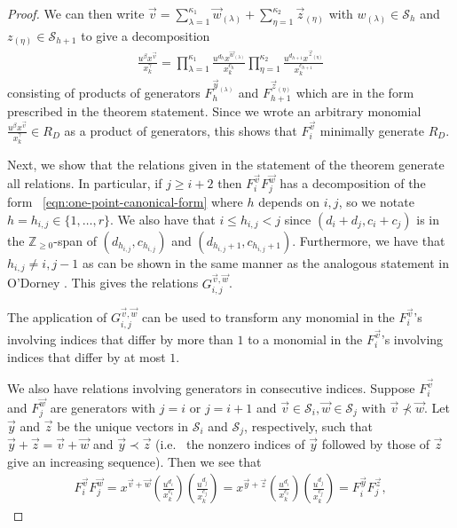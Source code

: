 \documentclass{amsart}
\theoremstyle{plain}
\theoremstyle{definition}
\theoremstyle{remark}
\numberwithin{equation}{section}
\newcommand\bz{{\mathbb Z}}
\newcommand\mss{\mathscr{S}}
\begin{document}
\begin{proof}
\noindent
We can then write $\vec{v}  = \sum_{\lambda=1}^{\kappa_1}\vec{w}_{(\lambda)} + \sum_{\eta=1}^{\kappa_2} \vec z_{(\eta)}$ with $w_{(\lambda)} \in \mss_h$ and $z_{(\eta)} \in \mss_{h+1}$ to give a decomposition
\begin{align}
\label{eqn:one-point-canonical-form}
	\frac{u^{\beta} x^{\vec{v}}} {x_k^{\gamma}}	= \prod_{\lambda = 1}
	^{\kappa_1} \frac{u^{d_h} x^{\vec{w}_{(\lambda)}}} {x_k^{c_h}}
	\prod_{\eta = 1}^{\kappa_2} \frac{u^{d_{h + 1}} x^{\vec{z}_{(\eta)}}}
	{x_k^{c_{h + 1}}}
\end{align}
\noindent
consisting of products of generators $F_h^{\vec{y}_{(\lambda)}}$
and $F_{h + 1}^{\vec{z}_{(\eta)}}$ which are in the form
prescribed in the theorem statement. Since we wrote an arbitrary monomial $\frac{u^{\beta} x^{\vec{v}}}{x_k^\gamma} \in R_D$ as a product of generators, this shows that $F_i^{\vec v}$ minimally generate $R_D$.

Next, we show that the relations given in the statement of the theorem generate all relations. 
In particular, if $j \geq i + 2$ then $F_i^{\vec{v}} F_j^{\vec{w}}$
has a decomposition of the form ~\eqref{eqn:one-point-canonical-form} where $h$ depends on $i, j$, so we notate $h = h_{i, j} \in \{1, \ldots, r\}$. We also have
that $i \leq h_{i, j} < j$ since $(d_i + d_j, c_i + c_j)$ is in the
$\bz_{\geq 0}$-span of $(d_{h_{i, j}}, c_{h_{i, j}})$ and
$(d_{h_{i, j} + 1}, c_{h_{i, j} + 1})$. Furthermore, we have that
$h_{i, j} \neq i, j-1$ as can be shown in the same manner as the analogous statement in O'Dorney
\cite[Theorem 6]{dorney:canonical}. This gives the relations
$G_{i, j}^{\vec{v}, \vec{w}}$.

The application of $G_{i, j}^{\vec{v}, \vec{w}}$ can be used
to transform any monomial in the $F_i^{\vec{v}}$'s involving
indices that differ by more than $1$ to a monomial in the $F_i
^{\vec{v}}$'s involving indices that differ by at most $1$.

We also have relations involving generators in consecutive
indices. Suppose $F_i^{\vec{v}}$ and $F_j^{\vec{w}}$ are
generators with $j = i$ or $j = i + 1$ and $\vec{v} \in
\mss_i, \vec{w} \in \mss_j$ with $\vec{v} \not\prec \vec{w}$.
Let $\vec{y}$ and $\vec{z}$ be the unique vectors in $\mss_i$ and
$\mss_j$, respectively, such that $\vec{y} + \vec{z} = \vec{v} +
\vec{w}$ and $\vec{y} \prec \vec{z}$ (i.e.~ the nonzero indices
of $\vec{y}$ followed by those of $\vec{z}$ give an increasing
sequence). Then we see that
\begin{align*}
	F_i^{\vec{v}} F_j^{\vec{w}} = x^{\vec{v} + \vec{w}}
	\left(\frac{u^{d_i}}{x_k^{c_i}}\right)
	\left(\frac{u^{d_j}}{x_k^{c_j}}\right)
	= x^{\vec{y} + \vec{z}}
	\left(\frac{u^{d_i}}{x_k^{c_i}}\right)
	\left(\frac{u^{d_j}}{x_k^{c_j}}\right)
	= F_i^{\vec{y}} F_j^{\vec{z}},
\end{align*}


\end{proof}
\end{document}
